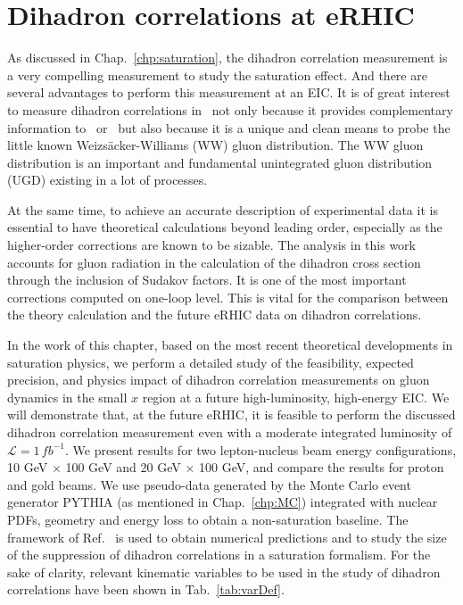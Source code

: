 \chapter{Dihadron correlations at eRHIC}
\label{chp:dihadron}
As discussed in Chap.~\ref{chp:saturation}, the dihadron correlation measurement
is a very compelling measurement to study the saturation effect. And there are
several advantages to perform this measurement at an EIC. It is of great
interest to measure dihadron correlations in \eA\ not only because it provides
complementary information to \dA\ or \pA\ but also because it is a unique and
clean means to probe the little known Weizs\"{a}cker-Williams (WW) gluon
distribution. The WW gluon distribution is an important and fundamental
unintegrated gluon distribution (UGD) existing in a lot of processes.

At the same time, to achieve an accurate description of experimental data it is
essential to have theoretical calculations beyond leading order, especially as
the higher-order corrections are known to be sizable. The analysis in this work
accounts for gluon radiation in the calculation of the dihadron cross section
through the inclusion of Sudakov factors. It is one of the most important
corrections computed on one-loop level. This is vital for the comparison between
the theory calculation and the future eRHIC data on dihadron correlations.

In the work of this chapter, based on the most recent theoretical developments in saturation
physics, we perform a detailed study of the feasibility, expected precision, and
physics impact of dihadron correlation measurements on gluon dynamics in the
small $x$ region at a future high-luminosity, high-energy EIC. We will
demonstrate that, at the future eRHIC, it is feasible to perform the discussed
dihadron correlation measurement even with a moderate integrated luminosity of
$\mathcal{L}=1 \, fb^{-1}$. We present results for two lepton-nucleus beam energy
configurations, 10 GeV $\times$ 100 GeV and 20 GeV $\times$ 100 GeV, and compare
the results for proton and gold beams. We use pseudo-data generated by the Monte
Carlo event generator PYTHIA (as mentioned in Chap.~\ref{chp:MC}) integrated with nuclear PDFs,
geometry and energy loss to obtain a non-saturation baseline. The framework of
Ref.~\cite{Dominguez:2011wm} is used to obtain numerical predictions and to
study the size of the suppression of dihadron correlations in a saturation
formalism. For the sake of clarity, relevant kinematic variables
to be used in the study of dihadron correlations have been shown
in Tab.~\ref{tab:varDef}.

